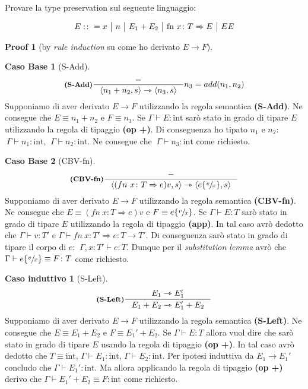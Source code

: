 \documentclass[a4paper, 10pt]{article}
\theoremstyle{definition}
\newtheorem{prf}{Proof}[]
\newtheorem{base}{Caso Base}
\newtheorem{ind}{Caso induttivo}
\newcommand{\infer}[4]{\inference[\textbf{#1}]{#2}{#3}#4 }
\newcommand{\srule}[2]{\langle #1 \rangle \rightarrowtriangle \langle #2 \rangle}
\newcommand{\subs}[3]{#1 \lbrace \sfrac{#2}{#3} \rbrace}
\newcommand{\goesto}{\rightarrowtriangle}
\begin{document}
\begin{multicols}{2}
Provare la type preservation sul seguente linguaggio:

\[
E:\colon = x \ \big|\ n \ \big|\ E_1 + E_2 \ \big|\ \textup{fn}\ x\colon T \Rightarrow E \ \big|\ EE
\]


	
\begin{prf}[by \textit{rule induction} su come ho derivato $ E\rightarrow F$]
	\begin{base}[S-Add]
		\[
			\infer{(S-Add)}{-}{\srule{n_1 + n_2,s}{n_3,s}}{n_3=add(n_1,n_2)}
		\]
		Supponiamo di aver derivato $ E\rightarrow F $ utilizzando la regola semantica \textbf{(S-Add)}. Ne consegue che $ E\equiv n_1 + n_2 $ e $ F\equiv n_3 $. Se $ \Gamma\vdash E\colon \text{int} $ sarò stato in grado di tipare $ E $ utilizzando la regola di tipaggio \textbf{(op +)}. Di conseguenza ho tipato $ n_1 $ e $ n_2 $: $ \ \Gamma\vdash n_1 \colon \text{int} $, 
		$ \ \Gamma\vdash n_2 \colon \text{int} $. Ne consegue che $ \ \Gamma\vdash n_3\colon \text{int} $ come richiesto.
	\end{base}
	\begin{base}[CBV-fn]
		\[
			\infer{(CBV-fn)}{-}{\srule{(fn\ x\colon T\Rightarrow e)v, s}{\subs{e}{v}{x}, s}}{}
		\]
		Supponiamo di aver derivato $ E\rightarrow F $ utilizzando la regola semantica \textbf{(CBV-fn)}. Ne consegue che $ E\equiv (fn\ x\colon T\Rightarrow e)v $ e $ F\equiv \subs{e}{v}{x} $. Se $ \Gamma\vdash E\colon T $ sarò stato in grado di tipare $ E $ utilizzando la regola di tipaggio \textbf{(app)}. In tal caso avrò dedotto che $ \Gamma \vdash v\colon T'$ e $ \Gamma\vdash fn\ x\colon T'\Rightarrow e \colon T\rightarrow T' $. Di conseguenza sarò stato in grado di tipare il corpo di $ e $: $ \ \Gamma, x\colon T'\vdash e\colon T $. Dunque per il \textit{substitution lemma} avrò che $ \Gamma\vdash\subs{e}{v}{x}\equiv F\colon T $ come richiesto.
	\end{base}
	\begin{ind}[S-Left]
		\[
			\infer{(S-Left)}{E_1 \goesto E_1' }{E_1 + E_2 \goesto E_1' + E_2}{} 
		\]
		Supponiamo di aver derivato $ E\rightarrow F $ utilizzando la regola semantica \textbf{(S-Left)}. Ne consegue che $ E\equiv E_1 + E_2 $ e $ F\equiv E_1' + E_2 $. Se $ \Gamma\vdash E\colon T $ allora vuol dire che sarò stato in grado di tipare $ E $ usando la regola di tipaggio \textbf{(op +)}. In tal caso avrò dedotto che $ T\equiv \text{int} $, $ \Gamma\vdash E_1\colon \text{int} $, $ \Gamma\vdash E_2\colon \text{int} $. Per ipotesi induttiva da $ E_1\rightarrow E_1' $ concludo che $ \Gamma\vdash E_1'\colon \text{int} $. Ma allora applicando la regola di tipaggio \textbf{(op +)} derivo che $ \Gamma\vdash E_1' + E_2\equiv F \colon \text{int} $ come richiesto.

\end{ind}
\end{prf}
\end{multicols}
\end{document}
